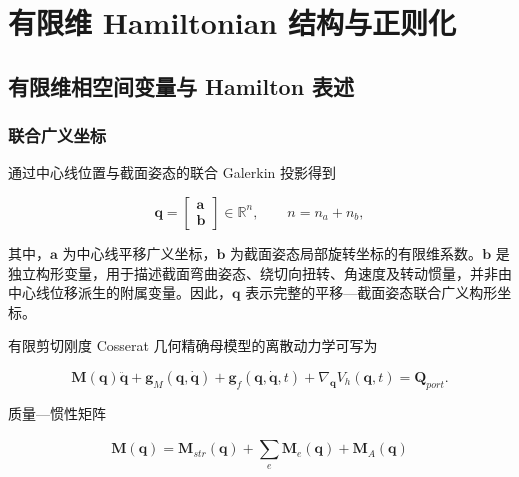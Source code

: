 \section{有限维 Hamiltonian 结构与正则化}\label{sec:hamiltonian-structure}

\subsection{有限维相空间变量与 Hamilton 表述}\label{sec:hamiltonian-3-1}

\subsubsection{联合广义坐标}\label{sec:hamiltonian-3-1-1}

通过中心线位置与截面姿态的联合 Galerkin 投影得到

\begin{equation}
\label{eq:hamiltonian-3-1}
\boxed{\mathbf{q} = \begin{bmatrix}
\mathbf{a} \\
\mathbf{b}
\end{bmatrix} \in \mathbb{R}^{n},\quad\quad n = n_{a} + n_{b},}
\end{equation}

其中，\(\mathbf{a}\) 为中心线平移广义坐标，\(\mathbf{b}\) 为截面姿态局部旋转坐标的有限维系数。\(\mathbf{b}\) 是独立构形变量，用于描述截面弯曲姿态、绕切向扭转、角速度及转动惯量，并非由中心线位移派生的附属变量。因此，\(\mathbf{q}\) 表示完整的平移---截面姿态联合广义构形坐标。

有限剪切刚度 Cosserat 几何精确母模型的离散动力学可写为

\begin{equation}
\label{eq:hamiltonian-3-2}
\boxed{\mathbf{M}\left( \mathbf{q} \right)\ddot{\mathbf{q}} + \mathbf{g}_{M}\left( \mathbf{q},\dot{\mathbf{q}} \right) + \mathbf{g}_{f}\left( \mathbf{q},\dot{\mathbf{q}},t \right) + \nabla_{\mathbf{q}}V_{h}\left( \mathbf{q},t \right) = \mathbf{Q}_{port}.}
\end{equation}

质量---惯性矩阵

\begin{equation}
\label{eq:hamiltonian-3-3}
\mathbf{M}\left( \mathbf{q} \right) = \mathbf{M}_{str}\left( \mathbf{q} \right) + \sum_{e}^{}\mathbf{M}_{e}\left( \mathbf{q} \right) + \mathbf{M}_{A}\left( \mathbf{q} \right)
\end{equation}

